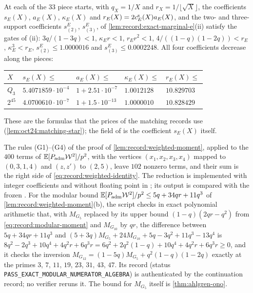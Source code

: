 \begin{certificate}\label{cert:record:e-coefficients}
At each of the $33$ piece starts, with $q_X=1/X$ and $r_X=1/\lfloor\sqrt X\rfloor$,
the coefficients $s_E(X)$, $a_E(X)$, $\kappa_E(X)$ and
$r_E(X)=2c^{\rm s}_E(X)a_E(X)$, and the two- and
three-support coefficients $s^E_{(2)}$, $s^E_{(3)}$, of
\cref{lem:record:exact-marginal-e}(ii) satisfy
the gates of (ii): $3q/(1-3q)<1$, $\kappa_Er<1$, $r_Er^2<1$,
$4/((1-q)(1-2q))<r_E$, $\kappa_E^3<r_E$, $s^E_{(2)}\le1.0000016$ and
$s^E_{(3)}\le0.0002248$. All four coefficients decrease along the pieces:
\begin{center}
\small
\begin{tabular}{@{}lllll@{}}
\toprule
$X$ & $s_E(X)\le$ & $a_E(X)\le$ & $\kappa_E(X)\le$ & $r_E(X)\le$\\
\midrule
$Q_3$ & $5.4071859\cdot10^{-4}$ & $1+2.51\cdot10^{-7}$ & $1.0012128$ & $10.829703$\\
$2^{45}$ & $4.0700610\cdot10^{-7}$ & $1+1.5\cdot10^{-13}$ & $1.0000010$ & $10.828429$\\
\bottomrule
\end{tabular}
\end{center}
These are the formulas that the prices of the matching records use
(\cref{lem:oct24:matching-star}); the field  of
 is the coefficient $s_E(X)$ itself.
\end{certificate}

\begin{certificate}
\label{cert:record:weighted-identity}
The rules (G1)--(G4) of the proof of \cref{lem:record:weighted-moment},
applied to the $400$ terms of $\mathbb E[P_{\rm adm}\mathcal W^2]/p^2$, with the
vertices $(x_1,x_2,x_3,x_4)$ mapped to $(0,3,1,4)$ and $(z,z')$ to $(2,5)$,
leave $102$ nonzero terms, and their sum is the right side of
\eqref{eq:record:weighted-identity}. The reduction is implemented with integer
coefficients and without floating point in
;
its output is compared with the frozen
.
For the modular bound $\mathbb E[P_{\rm adm}\mathcal W^2]/p^2\le5q+34qr+11q^3$ of
\cref{lem:record:weighted-moment}(b), the script
checks in exact polynomial arithmetic that, with $M_{G_5}$ replaced by its upper
bound $(1-q)(2qr-q^2)$ from \eqref{eq:record:modular-moment} and $M_{G_{10}}$ by
$qr$, the difference between $5q+34qr+11q^3$ and
$(5+3q)M_{G_5}+24M_{G_{10}}+5q-3q^2+11q^3-13q^4$ is
$8q^2-2q^3+10q^4+4q^2r+6q^3r=6q^2+2q^2(1-q)+10q^4+4q^2r+6q^3r\ge0$, and it
checks the inversion $M_{G_{12}}=(1-5q)M_{G_5}+q^2(1-q)(1-2q)$ exactly at the
primes $3$, $7$, $11$, $19$, $23$, $31$, $43$, $47$. Its record 
(status \texttt{PASS\_EXACT\_MODULAR\_NUMERATOR\_ALGEBRA}) is authenticated by
the continuation record; no verifier reruns it. The bound for $M_{G_5}$ itself
is \cref{thm:ahlgren-ono}.
\end{certificate}

